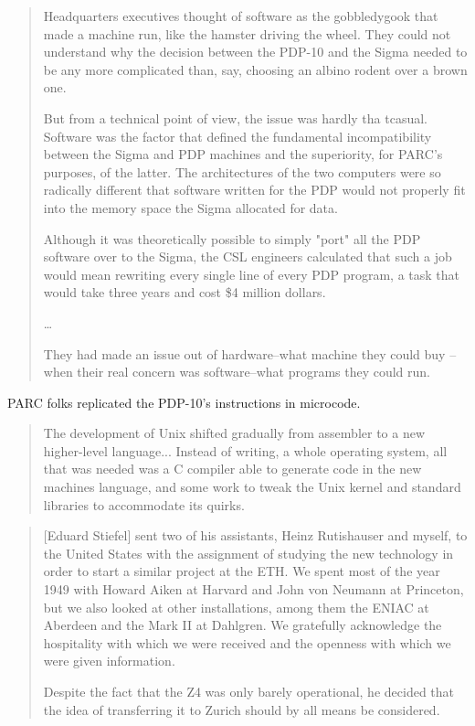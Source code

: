 \begin{quotation}
    Headquarters executives thought of software as the gobbledygook that made a machine run,
    like the hamster driving the wheel. They could not understand why the decision between the PDP-10
    and the Sigma needed to be any more complicated than, say, choosing an albino rodent over a brown one.

    But from a technical point of view, the issue was hardly tha tcasual.
    Software was the factor that defined the fundamental incompatibility between the Sigma and PDP machines
    and the superiority, for PARC's purposes, of the latter.
    The architectures of the two computers were so radically different that software written for the PDP would not
    properly fit into the memory space the Sigma allocated for data.

    Although it was theoretically possible to simply "port" all the PDP software over to the Sigma, the CSL
    engineers calculated that such a job would mean rewriting every single line of every PDP program,
    a task that would take three years and cost \$4 million dollars.

    \dots

    They had made an issue out of hardware--what machine they could buy
    --when their real concern was software--what programs they could run.
\end{quotation}

PARC folks replicated the PDP-10's instructions in microcode.


\begin{quotation}
The development of Unix shifted gradually from assembler to a new higher-level language...
Instead of writing, a whole operating system, all that was needed was a C compiler able to
generate code in the new machines language, and some work to tweak the Unix kernel and
standard libraries to accommodate its quirks.
\end{quotation}

\begin{quotation}
    [Eduard Stiefel] sent two of his assistants, Heinz Rutishauser and myself,
to the United States with the assignment of studying the new technology in order to start a similar project at
the ETH. We spent most of the year 1949 with Howard Aiken at Harvard and John von Neumann at
Princeton, but we also looked at other installations, among them the ENIAC at Aberdeen and the Mark II at
Dahlgren. We gratefully acknowledge the hospitality with which we were received and the openness with
which we were given information.

Despite the fact that the Z4 was only barely operational, he decided that the idea of transferring it to Zurich
should by all means be considered.
\end{quotation}

